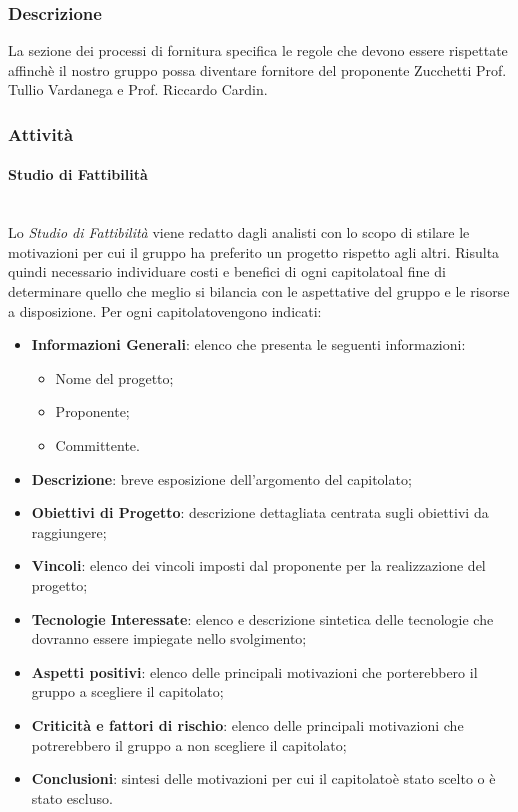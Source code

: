 \subsubsection{Descrizione}
La sezione dei processi di fornitura specifica le regole che devono essere rispettate affinchè il nostro gruppo possa diventare fornitore del proponente Zucchetti Prof. Tullio Vardanega e Prof. Riccardo Cardin.
\subsubsection{Attività}
\paragraph{Studio di Fattibilità}\mbox{}\\ [1mm]
Lo \textit{Studio di Fattibilità} viene redatto dagli analisti con lo scopo di stilare le motivazioni per cui il gruppo ha preferito un progetto rispetto agli altri.
Risulta quindi necessario individuare costi e benefici di ogni capitolato\glosp al fine di determinare quello che meglio si bilancia con le aspettative del gruppo e le risorse a disposizione.
Per ogni capitolato\glosp vengono indicati:
\begin{itemize}
	\item \textbf{Informazioni Generali}: elenco che presenta le seguenti informazioni: 
	\begin{itemize}
		\item Nome del progetto;
		\item Proponente;
		\item Committente.
	\end{itemize} 
	\item \textbf{Descrizione}: breve esposizione dell'argomento del capitolato\glosp;
	\item \textbf{Obiettivi di Progetto}: descrizione dettagliata centrata sugli obiettivi da raggiungere;
	\item \textbf{Vincoli}: elenco dei vincoli imposti dal proponente per la realizzazione del progetto;
	\item \textbf{Tecnologie Interessate}: elenco e descrizione sintetica delle tecnologie che dovranno essere impiegate nello svolgimento;
	\item \textbf{Aspetti positivi}: elenco delle principali motivazioni che porterebbero il gruppo a scegliere il capitolato\glo;
	\item \textbf{Criticità e fattori di rischio}: elenco delle principali motivazioni che potrerebbero il gruppo a non scegliere il capitolato\glo;
	\item \textbf{Conclusioni}: sintesi delle motivazioni per cui il capitolato\glosp è stato scelto o è stato escluso.
\end{itemize}
